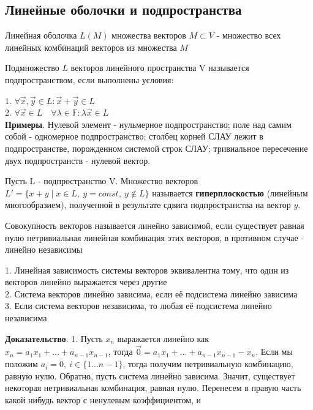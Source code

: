 \subsection{Линейные оболочки и подпространства}
\begin{defin}
Линейная оболочка $L(M)$ множества векторов $M\subset V$ - множество всех 
линейных комбинаций векторов из множества $M$
\end{defin}
\begin{defin}
Подмножество $L$ векторов линейного пространства V называется подпространством,
если выполнены условия:
\end{defin}
$1$. $\forall \Vec{x}, \Vec{y} \in L: \Vec{x}+\Vec{y}\in L$\\
$2$. $\forall \Vec{x} \in L \quad\forall 
\lambda\in \mathbb F: \lambda\Vec{x}\in L $\\
\textbf{Примеры}. Нулевой элемент - нульмерное подпространство; поле над самим 
собой - одномерное подпространство; столбец корней СЛАУ лежит в 
подпространстве, порожденном системой строк СЛАУ; тривиальное пересечение двух
подпространств - нулевой вектор.
\begin{defin}
Пусть L - подпространство V. Множество векторов 
$L'=\{x+y\mid x\in L,~y=const,~y\notin L\}$ называется \textbf{гиперплоскостью}
(линейным многообразием), полученной в результате сдвига подпространства на 
вектор $y$.
\end{defin}
\begin{defin}
Совокупность векторов называется линейно зависимой, если существует равная нулю 
нетривиальная линейная комбинация этих векторов, в противном случае - линейно 
независимы
\end{defin}
\begin{theor}\label{linzav}
1. Линейная зависимость системы векторов эквивалентна тому, что один из
векторов линейно выражается через другие\\
2. Система векторов линейно зависима, если её подсистема линейно зависима\\
3. Если система векторов независима, то любая её подсистема линейно независима
\end{theor}
\textbf{Доказательство}. 1. Пусть $x_n$ выражается линейно как
$x_n=a_1x_1+...+a_{n-1}x_{n-1}$, тогда
$\Vec{0}=a_1x_1+...+a_{n-1}x_{n-1}-x_n$.
Если мы положим $a_i=0,~i\in\{1...n-1\}$, тогда получим нетривиальную
комбинацию, равную нулю. Обратно, пусть
система линейно зависима. Значит, существует некоторая
нетривиальная комбинация, равная нулю. Перенесем в правую часть какой нибудь
вектор с ненулевым коэффициентом, и
